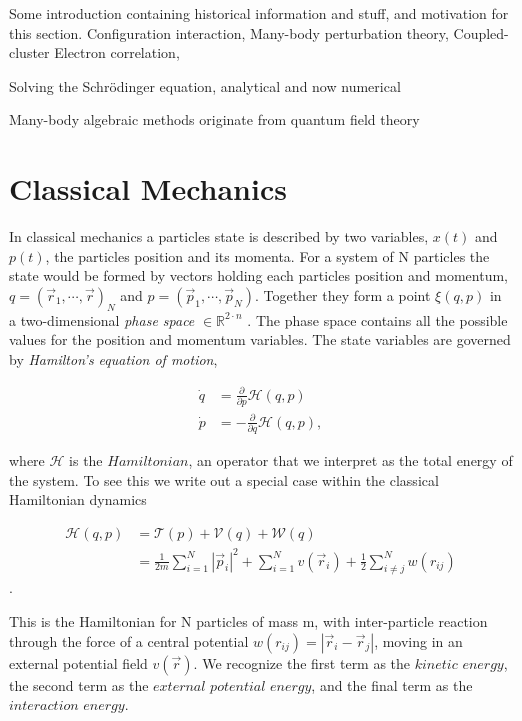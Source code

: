 Some introduction containing historical information and stuff, and motivation for this section. 
Configuration interaction, Many-body perturbation theory, Coupled-cluster 
Electron correlation,

Solving the Schrödinger equation, analytical and now numerical

Many-body algebraic methods originate from quantum field theory \cite{shavitt2009many}

\section{Classical Mechanics}

In classical mechanics a particles state is described by two variables, $x(t)$ and $p(t)$, the particles position and its momenta. For a system of N particles the state would be formed by vectors holding each particles position and momentum, $q = (\vec{r}_1, \cdots,\vec{r})_N$ and $p = (\vec{p}_1, \cdots,\vec{p}_N)$. 
Together they form a point $\xi(q, p)$ in a two-dimensional \textit{phase space} $\in \mathbb{R}^{2 \cdot n}$ \cite{kvaal}. The phase space contains all the possible values for the position and momentum variables.
The state variables are governed by \textit{Hamilton's equation of motion},

\begin{align}
\dot{q} &= \frac{\partial}{\partial p} \mathscr{H} (q, p) \\
\dot{p} &= -\frac{\partial}{\partial q} \mathscr{H} (q, p),
\end{align}

where $\mathscr{H}$ is the $\textit{Hamiltonian}$, an operator that we interpret as the total energy of the system. To see this we write out a special case within the classical Hamiltonian dynamics

\begin{align}
\mathscr{H}(q,p) &= \mathscr{T}(p) + \mathscr{V}(q) + \mathscr{W}(q) \\
&= \frac{1}{2m} \sum^N_{i=1} |\vec{p}_i|^2 + \sum^N_{i=1} v(\vec{r}_i) + \frac{1}{2} \sum^N_{i \neq j} w(r_{ij})
\end{align}.

This is the Hamiltonian for N particles of mass m, with inter-particle reaction through the force of a central potential $w(r_{ij}) = |\vec{r}_i - \vec{r}_j|$, moving in an external potential field $v(\vec{r})$. We recognize the first term as the $\textit{kinetic energy}$, the second term as the $\textit{external potential energy}$, and the final term as the $\textit{interaction energy}$.

